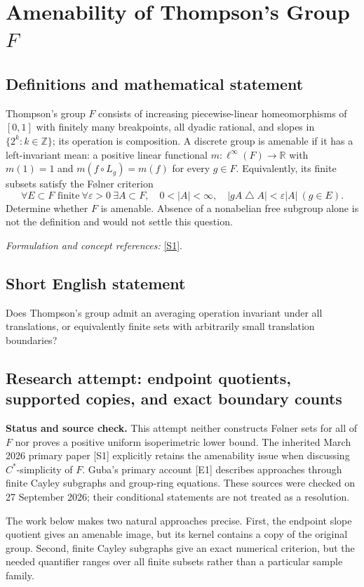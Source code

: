\documentclass[11pt]{article}
\begin{document}
\section*{\texorpdfstring{Amenability of Thompson's Group $F$}{Amenability of Thompson's Group \$F\$}}\label{30001681}
\subsection{Definitions and mathematical statement}
Thompson's group $F$ consists of increasing piecewise-linear homeomorphisms of $[0,1]$ with finitely many breakpoints, all dyadic rational, and slopes in $\{2^k:k\in{\mathbb{Z}}\}$; its operation is composition. A discrete group is amenable if it has a left-invariant mean: a positive linear functional $m:\ell^\infty(F)\to{\mathbb{R}}$ with $m(1)=1$ and $m(f\circ L_g)=m(f)$ for every $g\in F$. Equivalently, its finite subsets satisfy the F\o lner criterion
\[
 \forall E\subset F\text{ finite}\ \forall{\varepsilon}>0\ \exists A\subset F,
 \quad0<|A|<\infty,\quad |gA\mathbin{\triangle} A|<{\varepsilon}|A|\ (g\in E).
\]
Determine whether $F$ is amenable. Absence of a nonabelian free subgroup alone is not the definition and would not settle this question.
\par\smallskip\textit{Formulation and concept references:} \href{https://arxiv.org/abs/2603.28228}{[S1]}.

\subsection{Short English statement}
Does Thompson's group admit an averaging operation invariant under all translations, or equivalently finite sets with arbitrarily small translation boundaries?
\subsection{Research attempt: endpoint quotients, supported copies, and exact boundary counts}
\textbf{Status and source check.} This attempt neither constructs F\o lner sets for all of $F$ nor proves a positive uniform isoperimetric lower bound. The inherited March 2026 primary paper [S1] explicitly retains the amenability issue when discussing $C^*$-simplicity of $F$. Guba's primary account [E1] describes approaches through finite Cayley subgraphs and group-ring equations. These sources were checked on 27 September 2026; their conditional statements are not treated as a resolution.

The work below makes two natural approaches precise. First, the endpoint slope quotient gives an amenable image, but its kernel contains a copy of the original group. Second, finite Cayley subgraphs give an exact numerical criterion, but the needed quantifier ranges over all finite subsets rather than a particular sample family.
\end{document}
